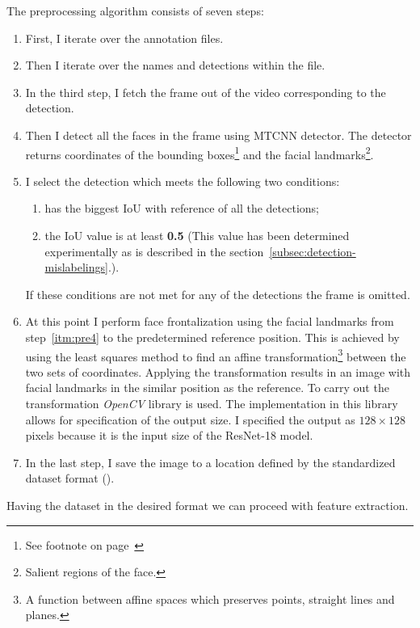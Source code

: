 The preprocessing algorithm consists of seven steps:
\begin{enumerate}
    \item First, I iterate over the annotation files.
    \item Then I iterate over the names and detections within the file.
    \item In the third step, I fetch the frame out of the video corresponding to the detection.
    \item \label{itm:pre4} Then I detect all the faces in the frame using MTCNN detector.
    The detector returns coordinates of the bounding boxes\footnote{See footnote on page~\pageref{foot:bbox}} and the
    facial landmarks\footnote{Salient regions of the face.}.
    \item I select the detection which meets the following two conditions:
    \begin{enumerate}
        \item has the biggest IoU with reference of all the detections;
        \item the IoU value is at least \textbf{0.5} (This value has been determined experimentally as
        is described in the section~\ref{subsec:detection-mislabelings}.).
    \end{enumerate}
    If these conditions are not met for any of the detections the frame is omitted.
    \item At this point I perform face frontalization using the facial landmarks from step~\ref{itm:pre4} to the
    predetermined reference position.
    This is achieved by using the least squares method to find an affine transformation\footnote{A function between
    affine spaces which preserves points, straight lines and planes.} between the two sets of coordinates.
    Applying the transformation results in an image with facial landmarks in the similar position as the reference.
    To carry out the transformation \textit{OpenCV} library is used.
    The implementation in this library allows for specification of the output size.
    I specified the output as $128 \times 128$ pixels because it is the input size of the ResNet-18 model.
    \item In the last step, I save the image to a location defined by the standardized dataset format
    ().
\end{enumerate}

Having the dataset in the desired format we can proceed with feature extraction.

